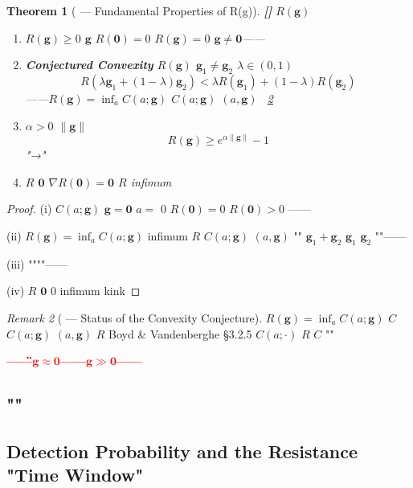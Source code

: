 \documentclass[12pt,a4paper]{article}
\newtheorem{theorem}{Theorem}[section]
\theoremstyle{remark}
\newtheorem{remark}[theorem]{Remark}
\newcommand{\g}{\mathbf{g}}
\newcommand{\honestcrit}[1]{%
    \textcolor{red}{\textbf{#1}}%
}
\newcommand{\rigorPartial}{\textnormal{\textbf{[]}}}
\begin{document}
\begin{theorem}[ — Fundamental Properties of R(g)]\label{thm:R_properties}\rigorPartial
 $ R(\g) $ 
\begin{enumerate}[label=(\roman*)]
    \item \textbf{} $ R(\g) \geq 0 $  $ \g $ $ R(\mathbf{0}) = 0 $ $ R(\g) = 0 $  $ \g \neq \mathbf{0} $——
    \item \textbf{Conjectured Convexity}  $ R(\g) $  $ \g_1 \neq \g_2 $  $ \lambda \in (0,1) $
        \begin{equation}
            R(\lambda \g_1 + (1-\lambda)\g_2) < \lambda R(\g_1) + (1-\lambda) R(\g_2)
        \end{equation}
        ——$ R(\g) = \inf_{a} C(a; \g) $  $ C(a; \g) $  $ (a, \g) $ ~\ref{rem:convexity_conjecture}
    \item \textbf{}  $ \alpha > 0 $  $ \| \g \| $
        \begin{equation}
            R(\g) \geq e^{\alpha \| \g \|} - 1
        \end{equation}
        "→"
    \item \textbf{}  $ R $  $ \mathbf{0} $  $ \nabla R(\mathbf{0}) = \mathbf{0} $ $ R $  infimum
\end{enumerate}
\end{theorem}

\begin{proof}
(i)  $ C(a; \g) $ $ \g = \mathbf{0} $  $ a = \text{} $  0 $ R(\mathbf{0}) = 0 $ $ R(\mathbf{0}) > 0 $ ——

(ii) $ R(\g) = \inf_a C(a; \g) $  infimum  $ R $  $ C(a; \g) $  $ (a, \g) $ "" $ \g_1 + \g_2 $  $ \g_1 $  $ \g_2 $ ""——

(iii) """"——

(iv)  $ R $  $ \mathbf{0} $  0 infimum  kink
\end{proof}

\begin{remark}[ — Status of the Convexity Conjecture]\label{rem:convexity_conjecture}
$ R(\g) = \inf_{a} C(a; \g) $  $ C $  $ C(a; \g) $  $ (a, \g) $  $ R $  Boyd \& Vandenberghe §3.2.5 $ C(a; \cdot) $  $ R $  $ C $ ""
\end{remark}

\honestcrit{——\"\"\"\"$ \g \approx \mathbf{0} $——$ \g \gg \mathbf{0} $——}

\subsection{""}
\subsection{Detection Probability and the Resistance "Time Window"}
\end{document}
